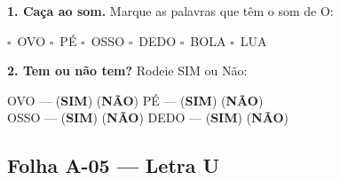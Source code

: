 \begin{somletra}[title={\faMusic~Atividade de Som da Vogal --- B\^onus (n\~ao vale nota)}]
\textbf{1. Ca\c{c}a ao som.} Marque as palavras que t\^e{}m o som de O:
\begin{center}
$\square$~OVO \quad $\square$~P\'E \quad $\square$~OSSO \quad $\square$~DEDO \quad $\square$~BOLA \quad $\square$~LUA
\end{center}

\textbf{2. Tem ou n\~ao{} tem?} Rodeie SIM ou N\~ao:
\begin{center}
OVO --- (\textbf{SIM}) (\textbf{N\~AO}) \quad P\'E --- (\textbf{SIM}) (\textbf{N\~AO}) \\ OSSO --- (\textbf{SIM}) (\textbf{N\~AO}) \quad DEDO --- (\textbf{SIM}) (\textbf{N\~AO})
\end{center}
\end{somletra}



\subsection{Folha A-05 --- Letra U}

